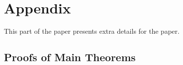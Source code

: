 \section{Appendix}
This part of the paper presents extra details for the paper. 
\subsection{Proofs of Main Theorems}
